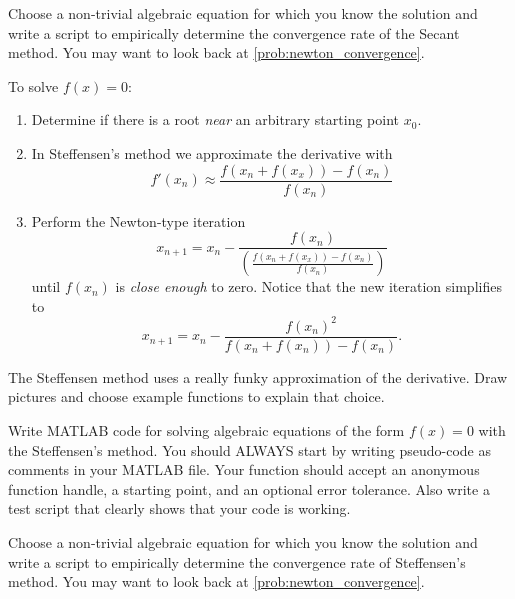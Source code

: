 \begin{problem}
    Choose a non-trivial algebraic equation for which you know the solution and write a
    script to empirically determine the convergence rate of the Secant method.  You may want to
    look back at \ref{prob:newton_convergence}.
\end{problem}


\begin{algorithm}
    To solve $f(x) = 0$:
    \begin{enumerate}
        \item Determine if there is a root {\it near} an arbitrary starting point $x_0$.
        \item In Steffensen's method we approximate the derivative with 
            \[ f'(x_n) \approx \frac{f(x_n + f(x_x)) - f(x_n)}{f(x_n)} \]
        \item Perform the Newton-type iteration 
            \[ x_{n+1} = x_n - \frac{f(x_n)}{ \left(  \frac{f(x_n + f(x_x)) - f(x_n)}{f(x_n)}\right)} \]
            until $f(x_n)$ is {\it close enough} to zero.  Notice that the new iteration
            simplifies to
            \[ x_{n+1} = x_n - \frac{f(x_n)^2}{f(x_n + f(x_n)) -
            f(x_{n})}. \]
    \end{enumerate}
\end{algorithm}

\begin{problem}
    The Steffensen method uses a really funky approximation of the derivative.  Draw
    pictures and choose example functions to explain that choice.
\end{problem}

\begin{problem}
    Write MATLAB code for solving algebraic equations of the form $f(x) = 0$ with the
    Steffensen's method. You should ALWAYS start by writing pseudo-code as comments in your
    MATLAB file.    Your function should accept an anonymous function handle, a
    starting point, and an optional error tolerance.  Also write a test script that
    clearly shows that your code is working. \\ 
\end{problem}

\begin{problem}
    Choose a non-trivial algebraic equation for which you know the solution and write a
    script to empirically determine the convergence rate of Steffensen's method.  You may want to
    look back at \ref{prob:newton_convergence}.
\end{problem}


